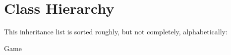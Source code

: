 \section{Class Hierarchy}
This inheritance list is sorted roughly, but not completely, alphabetically\+:\begin{DoxyCompactList}
\item Game\begin{DoxyCompactList}
\item {}
\end{DoxyCompactList}
\item {}
\end{DoxyCompactList}
